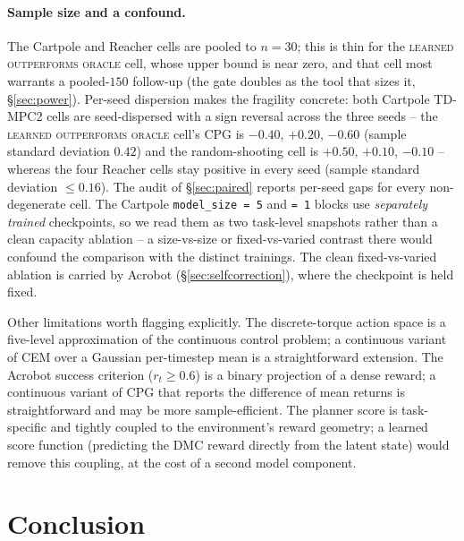 \documentclass[10pt,letterpaper]{article}
\begin{document}
\paragraph{Sample size and a confound.} The Cartpole and Reacher cells are pooled to $n = 30$; this is thin for the \textsc{learned outperforms oracle} cell, whose upper bound is near zero, and that cell most warrants a pooled-$150$ follow-up (the gate doubles as the tool that sizes it, \S\ref{sec:power}). Per-seed dispersion makes the fragility concrete: both Cartpole TD-MPC2 cells are seed-dispersed with a sign reversal across the three seeds -- the \textsc{learned outperforms oracle} cell's CPG is $-0.40$, $+0.20$, $-0.60$ (sample standard deviation $0.42$) and the random-shooting cell is $+0.50$, $+0.10$, $-0.10$ -- whereas the four Reacher cells stay positive in every seed (sample standard deviation $\leq 0.16$). The audit of \S\ref{sec:paired} reports per-seed gaps for every non-degenerate cell. The Cartpole \texttt{model\_size = 5} and \texttt{= 1} blocks use \emph{separately trained} checkpoints, so we read them as two task-level snapshots rather than a clean capacity ablation -- a size-vs-size or fixed-vs-varied contrast there would confound the comparison with the distinct trainings. The clean fixed-vs-varied ablation is carried by Acrobot (\S\ref{sec:selfcorrection}), where the checkpoint is held fixed.

Other limitations worth flagging explicitly. The discrete-torque action space is a five-level approximation of the continuous control problem; a continuous variant of CEM over a Gaussian per-timestep mean is a straightforward extension. The Acrobot success criterion ($r_t \geq 0.6$) is a binary projection of a dense reward; a continuous variant of CPG that reports the difference of mean returns is straightforward and may be more sample-efficient. The planner score is task-specific and tightly coupled to the environment's reward geometry; a learned score function (predicting the DMC reward directly from the latent state) would remove this coupling, at the cost of a second model component.

\section{Conclusion}
\end{document}
